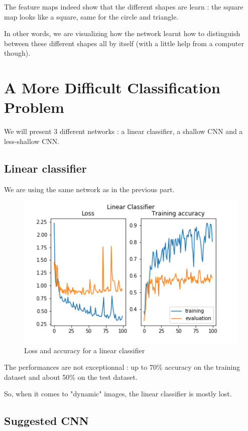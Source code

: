 \documentclass[]{article}
\begin{document}
The feature maps indeed show that the different shapes are learn : the square map looks like a square, same for the circle and triangle.

In other words, we are visualizing how the network learnt how to distinguish between these different shapes all by itself (with a little help from a computer though).


\section{A More Difficult Classification Problem}

We will present 3 different networks : a linear classifier, a shallow CNN and a less-shallow CNN.

\subsection{Linear classifier}

We are using the same network as in the previous part.

\begin{figure}[h!]
	
	\includegraphics{figures/part3_linear}
	\caption{Loss and accuracy for a linear classifier}
\end{figure}

The performances are not exceptionnal : up to 70\% accuracy on the training dataset and about 50\% on the test dataset. 

So, when it comes to "dynamic" images, the linear classifier is mostly lost.

\subsection{Suggested CNN}
\end{document}
